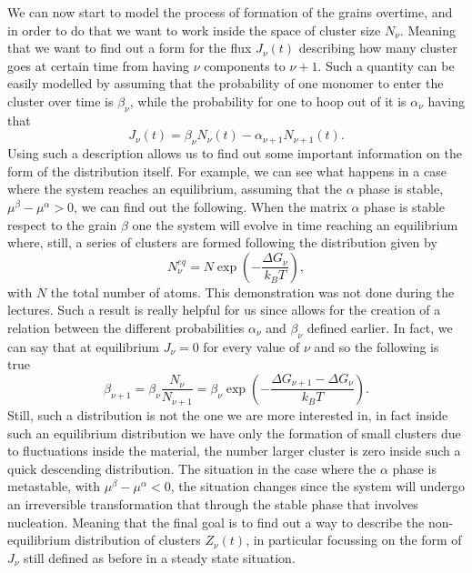 We can now start to model the process of formation of the grains overtime, and in order to do that we want to work inside the space of cluster size $N_\nu$. Meaning that we want to find out a form for the flux $J_\nu(t)$ describing how many cluster goes at certain time from having $\nu$ components to $\nu+1$. Such a quantity can be easily modelled by assuming that the probability of one monomer to enter the cluster over time is $\beta_\nu$, while the probability for one to hoop out of it is $\alpha_\nu$ having that
\begin{equation}
    J_\nu(t) = \beta_\nu N_\nu(t) - \alpha_{\nu+1} N_{\nu+1}(t).
\end{equation}
Using such a description allows us to find out some important information on the form of the distribution itself. For example, we can see what happens in a case where the system reaches an equilibrium, assuming that the $\alpha$ phase is stable, $\mu^\beta - \mu^\alpha > 0$, we can find out the following.
{
    When the matrix $\alpha$ phase is stable respect to the grain $\beta$ one the system will evolve in time reaching an equilibrium where, still, a series of clusters are formed following the distribution given by
    \begin{equation}
        N_\nu^{eq} = N\exp\left( -\frac{\Delta G_\nu}{k_BT} \right),
    \end{equation}
    with $N$ the total number of atoms.
}
{
    This demonstration was not done during the lectures.
}
\noindent
Such a result is really helpful for us since allows for the creation of a relation between the different probabilities $\alpha_\nu$ and $\beta_\nu$ defined earlier. In fact, we can say that at equilibrium $J_\nu = 0$ for every value of $\nu$ and so the following is true
\begin{equation}
    \label{eq:CoeffRelation}
    \beta_{\nu + 1} = \beta_\nu\frac{N_\nu}{N_{\nu+1}} = \beta_\nu\exp\left( -\frac{\Delta G_{\nu+1} - \Delta G_\nu}{k_BT} \right).
\end{equation}
Still, such a distribution is not the one we are more interested in, in fact inside such an equilibrium distribution we have only the formation of small clusters due to fluctuations inside the material, the number larger cluster is zero inside such a quick descending distribution. The situation in the case where the $\alpha$ phase is metastable, with $\mu^\beta - \mu^\alpha < 0$, the situation changes since the system will undergo an irreversible transformation that through the stable phase that involves nucleation. Meaning that the final goal is to find out a way to describe the non-equilibrium distribution of clusters $Z_\nu(t)$, in particular focussing on the form of $J_\nu$ still defined as before in a steady state situation.
